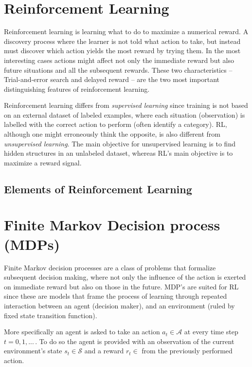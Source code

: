 \section{Reinforcement Learning}

Reinforcement learning is learning what to do to maximize a numerical reward. A discovery process where the learner is not told what action to take, but instead must discover which action yields the most reward by trying them. In the most interesting cases actions might affect not only the immediate reward but also future situations and all the subsequent rewards. These two characteristics -- Trial-and-error search and delayed reward -- are the two most important distinguishing features of reinforcement learning.

Reinforcement learning differs from \textit{supervised learning} since training is not based on an external dataset of labeled examples, where each situation (observation) is labelled with the correct action to perform (often identify a category). RL, although one might erroneously think the opposite, is also different from \textit{unsupervised learning}. The main objective for unsupervised learning is to find hidden structures in an unlabeled dataset, whereas RL's main objective is to maximize a reward signal. 

\subsection{Elements of Reinforcement Learning}

\section{Finite Markov Decision process (MDPs)}

Finite Markov decision processes are a class of problems that formalize subsequent decision making, where not only the influence of the action is exerted on immediate reward but also on those in the future. MDP's are suited for RL since these are models that frame the process of learning through repeated interaction between an agent (decision maker), and an environment (ruled by fixed state transition function).

More specifically an agent is asked to take an action \( a_t \in \mathcal{A} \) at every time step \( t = 0,1,...\, \). To do so the agent is provided with an observation of the current environment's state \( s_t \in \mathcal{S} \) and a reward \( r_t \in \) from the previously performed action.

